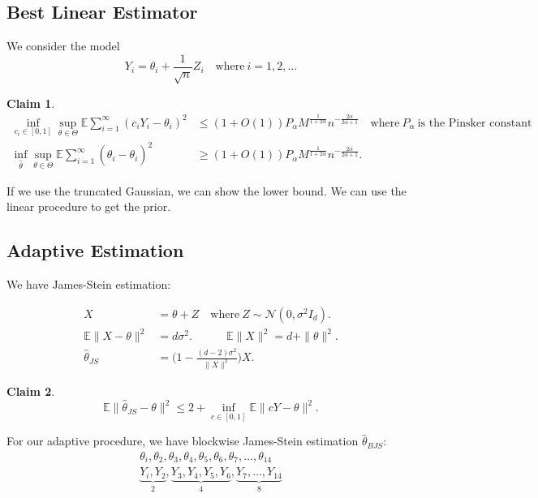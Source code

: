 \documentclass[twoside]{article}
\theoremstyle{definition}
\theoremstyle{definition}
\newtheorem*{claim}{Claim}
\theoremstyle{remark}
\begin{document}
\subsection{Best Linear Estimator}

We consider the model
\[
Y_{i} = \theta_{i} + \frac{1}{\sqrt{n}} Z_{i} \quad \text{where} \ i=1, 2, \ldots
\]

\begin{claim}
\[
\begin{aligned}
\inf \limits_{c_i \in [0, 1]} \sup \limits_{\theta \in \Theta} \mathbb{E} \sum \limits_{i=1}^\infty (c_i Y_i - \theta_i)^2 &\leq (1+ O(1)) P_\alpha M^{\frac{1}{1+2\alpha}} n^{-\frac{2\alpha}{2\alpha + 1}} \quad \text{where} \ P_\alpha \ \text{is the Pinsker constant} \\
\inf \limits_{\hat\theta} \sup \limits_{\theta \in \Theta} \mathbb{E} \sum \limits_{i=1}^\infty (\hat\theta_i - \theta_i)^2 &\geq (1+O(1)) P_\alpha M^{\frac{1}{1+2\alpha}} n^{-\frac{2\alpha}{2\alpha + 1}}.
\end{aligned} 
\]

If we use the truncated Gaussian, we can show the lower bound. We can use the linear procedure to get the prior.

\end{claim}

\subsection{Adaptive Estimation}

We have James-Stein estimation:

\[
\begin{aligned}
X &= \theta + Z \quad \text{where} \ Z \sim \mathcal{N}(0, \sigma^2 I_d). \\
\mathbb{E} \| X - \theta \|^2 &= d\sigma^2. \quad \quad \quad \mathbb{E} \| X \|^2 = d + \| \theta \|^2. \\
\hat\theta_{JS} &= \Bigg( 1 - \frac{(d-2) \sigma^2}{\| X \|^2} \Bigg) X.
\end{aligned}
\]

\begin{claim}
\[
\mathbb{E} \| \hat\theta_{JS} - \theta \|^2 \leq 2 + \inf \limits_{c \in [0, 1]} \mathbb{E} \| cY - \theta \|^2.
\]
\end{claim}

For our adaptive procedure, we have blockwise James-Stein estimation $\hat\theta_{BJS}$:
\[
\begin{aligned}
\theta_i, \theta_2, \theta_3, \theta_4, \theta_5, \theta_6, \theta_7, \ldots, \theta_{14} \\
\underbrace{Y_i, Y_2}_\text{2}, \underbrace{Y_3, Y_4, Y_5, Y_6}_\text{4}, \underbrace{Y_7, \ldots, Y_{14}}_\text{8}
\end{aligned}
\]
\end{document}
